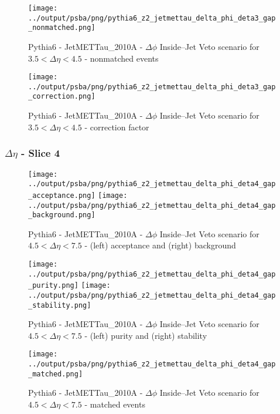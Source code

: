 \documentclass[11pt]{book}
\begin{document}
\begin{figure}[ht]
\centering
\texttt{[image: ../output/psba/png/pythia6\_z2\_jetmettau\_delta\_phi\_deta3\_gap\_nonmatched.png]}
\caption{Pythia6 - JetMETTau\_2010A - $\Delta\phi$ Inside--Jet Veto scenario for $3.5 < \Delta\eta < 4.5$ - nonmatched events}
\label{fig:p6_jetmettau_delta_phi_deta3_gap_nonmatched}
\end{figure}

\begin{figure}[ht]
\centering
\texttt{[image: ../output/psba/png/pythia6\_z2\_jetmettau\_delta\_phi\_deta3\_gap\_correction.png]}
\caption{Pythia6 - JetMETTau\_2010A - $\Delta\phi$ Inside--Jet Veto scenario for $3.5 < \Delta\eta < 4.5$ - correction factor}
\label{fig:p6_jetmettau_delta_phi_deta3_gap_correction}
\end{figure}

\clearpage
\subsubsection{$\Delta\eta$ - Slice 4}
\begin{figure}[ht]
\centering
\texttt{[image: ../output/psba/png/pythia6\_z2\_jetmettau\_delta\_phi\_deta4\_gap\_acceptance.png]}
\texttt{[image: ../output/psba/png/pythia6\_z2\_jetmettau\_delta\_phi\_deta4\_gap\_background.png]}
\caption{Pythia6 - JetMETTau\_2010A - $\Delta\phi$ Inside--Jet Veto scenario for $4.5 < \Delta\eta < 7.5$ - (left) acceptance and (right) background}
\label{fig:p6_jetmettau_delta_phi_deta4_gap_ab}
\end{figure}

\begin{figure}[ht]
\centering
\texttt{[image: ../output/psba/png/pythia6\_z2\_jetmettau\_delta\_phi\_deta4\_gap\_purity.png]}
\texttt{[image: ../output/psba/png/pythia6\_z2\_jetmettau\_delta\_phi\_deta4\_gap\_stability.png]}
\caption{Pythia6 - JetMETTau\_2010A - $\Delta\phi$ Inside--Jet Veto scenario for $4.5 < \Delta\eta < 7.5$ - (left) purity and (right) stability}
\label{fig:p6_jetmettau_delta_phi_deta4_gap_ps}
\end{figure}

\begin{figure}[ht]
\centering
\texttt{[image: ../output/psba/png/pythia6\_z2\_jetmettau\_delta\_phi\_deta4\_gap\_matched.png]}
\caption{Pythia6 - JetMETTau\_2010A - $\Delta\phi$ Inside--Jet Veto scenario for $4.5 < \Delta\eta < 7.5$ - matched events}
\label{fig:p6_jetmettau_delta_phi_deta4_gap_matched}
\end{figure}
\end{document}
